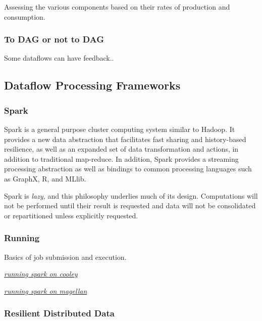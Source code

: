 Assessing the various components based on their rates of production and
consumption.

\subsubsection{To DAG or not to DAG}\label{to-dag-or-not-to-dag}

Some dataflows can have feedback..

\subsection{Dataflow Processing Frameworks}\label{dataflow-processing-frameworks}

\subsubsection{Spark}\label{spark}

Spark is a general purpose cluster computing system similar to Hadoop.
It provides a new data abstraction that facilitates fast sharing and
history-based resilience, as well as an expanded set of data
transformation and actions, in addition to traditional map-reduce. In
addition, Spark provides a streaming processing abstraction as well as
bindings to common processing languages such as GraphX, R, and MLlib.

Spark is \emph{lazy,} and this philosophy underlies much of its design.
Computations will not be performed until their result is requested and
data will not be consolidated or repartitioned unless explicitly
requested.

\subsubsection{Running}\label{running}

Basics of job submission and execution.

\href{https://docs.google.com/document/d/1fq3z1-oEcCBhjKA__vl8LsVm3-uArJik7YFLYvYoN1Y/edit?usp=sharing}{\emph{running
spark on cooley}}

\href{https://docs.google.com/document/d/1lyzEHap1EznES0DKiMa3fsalepqPD6vnbZqSEMjCVPQ/edit?usp=sharing}{\emph{running
spark on magellan}}

\subsubsection{Resilient Distributed Data}\label{resilient-distributed-data}

